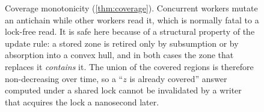 {\begin{figure}[tb]
\caption{Coverage monotonicity (\cref{thm:coverage}).  Concurrent workers
mutate an antichain while other workers read it, which is normally fatal to a
lock-free read.  It is safe here because of a structural property of the update
rule: a stored zone is retired only by subsumption or by absorption into a
convex hull, and in both cases the zone that replaces it \emph{contains} it.
The union of the covered regions is therefore non-decreasing over time, so a
``$z$ is already covered'' answer computed under a shared lock cannot be
invalidated by a writer that acquires the lock a nanosecond later.}
\label{fig:coverage}
\end{figure}}
